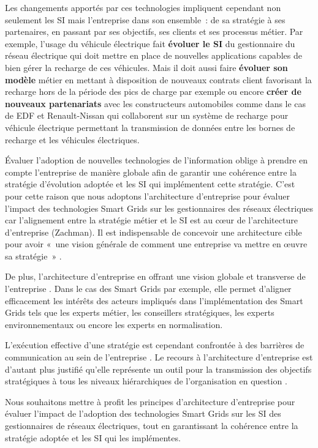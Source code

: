 Les changements apportés par ces technologies impliquent cependant non seulement 
les SI mais l'entreprise dans son ensemble~: de sa stratégie à ses partenaires, 
en passant par ses objectifs, ses clients et ses processus métier. Par exemple, 
l'usage du véhicule électrique fait \textbf{évoluer le SI} du gestionnaire du 
réseau électrique qui doit mettre en place de nouvelles applications capables de 
bien gérer la recharge de ces véhicules. Mais il doit aussi faire 
\textbf{évoluer son modèle} métier en mettant à disposition de nouveaux contrats 
client favorisant la recharge hors de la période des pics de charge par exemple 
ou encore \textbf{créer de nouveaux partenariats} avec les constructeurs 
automobiles comme dans le cas de EDF et Renault-Nissan qui collaborent sur un 
système de recharge pour véhicule électrique permettant la transmission de 
données entre les bornes de recharge et les véhicules électriques.

Évaluer l'adoption de nouvelles technologies de l'information oblige à prendre 
en compte l'entreprise de manière globale afin de garantir une cohérence entre 
la stratégie d'évolution adoptée et les SI qui implémentent cette stratégie. 
C'est pour cette raison que nous adoptons l'architecture d'entreprise pour 
évaluer l'impact des technologies Smart Grids sur les gestionnaires des réseaux 
électriques car l'alignement entre la stratégie métier et le SI est au cœur de 
l'architecture d'entreprise (Zachman). Il est indispensable de concevoir une 
architecture cible pour avoir  «~une vision générale de comment une entreprise 
va mettre en œuvre sa stratégie~» \cite{ross2006enterprise}.

De plus, l'architecture d'entreprise en offrant une vision globale et transverse 
de l'entreprise \cite{zachman1987framework}. Dans le cas des Smart Grids par 
exemple, elle permet d'aligner efficacement les intérêts des acteurs impliqués 
dans l'implémentation des Smart Grids tels que les experts métier, les 
conseillers stratégiques, les experts environnementaux ou encore les experts en 
normalisation.

L'exécution effective d'une stratégie est cependant confrontée à des barrières 
de communication au sein de l'entreprise \cite{vcater2010factors}. Le recours à 
l'architecture d'entreprise est d'autant plus justifié qu'elle représente un 
outil pour la transmission des objectifs stratégiques à tous les niveaux 
hiérarchiques de l'organisation en question \cite{kappelman2008enterprise}. 

Nous souhaitons mettre à profit les principes d'architecture d'entreprise pour 
évaluer l'impact de l'adoption des technologies Smart Grids sur les SI des 
gestionnaires de réseaux électriques, tout en garantissant la cohérence entre la 
stratégie adoptée et les SI qui les implémentes. 



